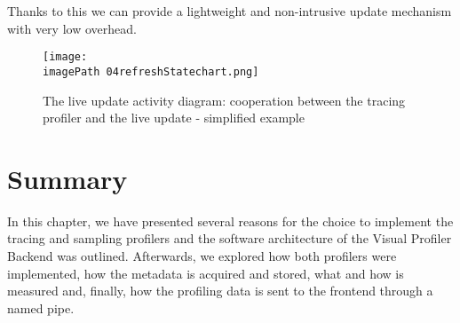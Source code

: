 Thanks to this we can provide a lightweight and non-intrusive update mechanism with very low overhead. 

\begin{figure}
	\centering
		\texttt{[image: \\imagePath 04refreshStatechart.png]}
		\caption{The live update activity diagram: cooperation between the tracing profiler and the live update  - simplified example }
	\label{fig:04refreshStatechart}
\end{figure}

 
\section{Summary}
In this chapter, we have presented several reasons for the choice to implement the tracing and sampling profilers and the software architecture of the Visual Profiler Backend was outlined. Afterwards, we explored how both profilers were implemented, how the metadata is acquired and stored, what and how is measured and, finally, how the profiling data is sent to the frontend through a named pipe.






